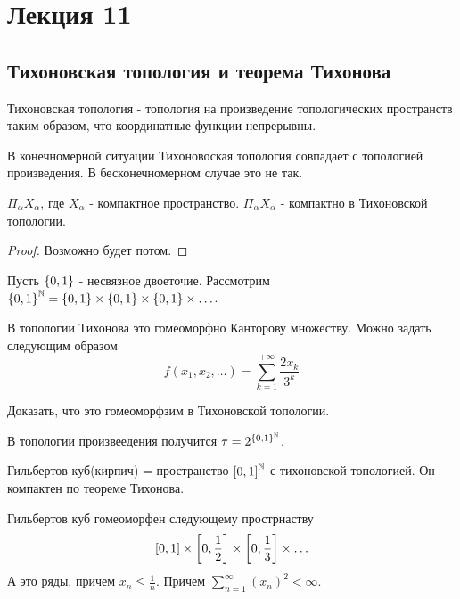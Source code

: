 \section{Лекция 11}

\subsection{Тихоновская топология и теорема Тихонова}

\begin{definition}
    Тихоновская топология - топология на произведение топологических пространств таким образом, что координатные функции непрерывны.
\end{definition}

\begin{nota_bene}
    В конечномерной ситуации Тихоновоская топология совпадает с топологией произведения. В бесконечномерном случае это не так.
\end{nota_bene}

\begin{theorem}[Тихонов]
    $\Pi_{\alpha} X_{\alpha}$, где $X_\alpha$ - компактное пространство. $\Pi_{\alpha} X_{\alpha}$ - компактно в Тихоновской топологии.
\end{theorem}
\begin{proof}
    Возможно будет потом.
\end{proof}

\begin{example}
    Пусть $\left\{0, 1\right\}$ - несвязное двоеточие. Рассмотрим $\left\{0, 1\right\}^{\mathbb{N}} = \left\{0, 1\right\} \times \left\{0, 1\right\} \times \left\{0, 1\right\} \times \ldots$.
    
    В топологии Тихонова это гомеоморфно Канторову множеству.
    Можно задать следующим образом
    \[
        f(x_1, x_2, \ldots) = \sum_{k = 1}^{+\infty} \frac{2 x_k}{3^k}
    \]
    \begin{exercise}
        Доказать, что это гомеоморфзим в Тихоновской топологии.
    \end{exercise}


    В топологии произвеедения получится $\tau = 2^{\left\{0, 1\right\}^{\mathbb{N}}}$.
\end{example}

\begin{example}
    Гильбертов куб(кирпич) = пространство $\left[0, 1\right]^{\mathbb{N}}$ с тихоновской топологией.
    Он компактен по теореме Тихонова.

    Гильбертов куб гомеоморфен следующему прострнаству
    \[
        \left[0, 1\right] \times \left[0, \frac{1}{2}\right] \times \left[0, \frac{1}{3}\right] \times \ldots
    \]
    А это ряды, причем $x_n \leq \frac{1}{n}$. Причем $\sum_{n = 1 }^{\infty}(x_n)^2 < \infty$.
\end{example}


